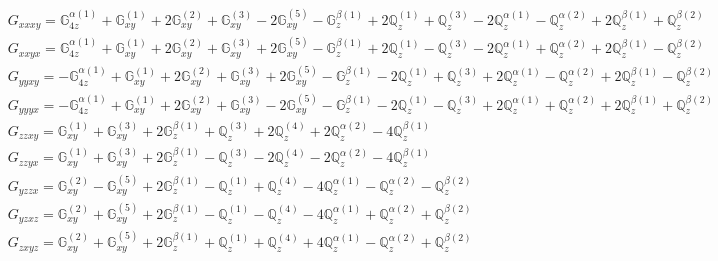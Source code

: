 \documentclass[fleqn,8pt,landscape]{jsarticle}
\begin{document}
\begin{align*}
& G_{xxxy} = \mathbb{G}_{4z}^{\alpha(1)} + \mathbb{G}_{xy}^{(1)} + 2 \mathbb{G}_{xy}^{(2)} + \mathbb{G}_{xy}^{(3)} - 2 \mathbb{G}_{xy}^{(5)} - \mathbb{G}_{z}^{\beta(1)} + 2 \mathbb{Q}_{z}^{(1)} + \mathbb{Q}_{z}^{(3)} - 2 \mathbb{Q}_{z}^{\alpha(1)} - \mathbb{Q}_{z}^{\alpha(2)} + 2 \mathbb{Q}_{z}^{\beta(1)} + \mathbb{Q}_{z}^{\beta(2)} \\
& G_{xxyx} = \mathbb{G}_{4z}^{\alpha(1)} + \mathbb{G}_{xy}^{(1)} + 2 \mathbb{G}_{xy}^{(2)} + \mathbb{G}_{xy}^{(3)} + 2 \mathbb{G}_{xy}^{(5)} - \mathbb{G}_{z}^{\beta(1)} + 2 \mathbb{Q}_{z}^{(1)} - \mathbb{Q}_{z}^{(3)} - 2 \mathbb{Q}_{z}^{\alpha(1)} + \mathbb{Q}_{z}^{\alpha(2)} + 2 \mathbb{Q}_{z}^{\beta(1)} - \mathbb{Q}_{z}^{\beta(2)} \\
& G_{yyxy} = - \mathbb{G}_{4z}^{\alpha(1)} + \mathbb{G}_{xy}^{(1)} + 2 \mathbb{G}_{xy}^{(2)} + \mathbb{G}_{xy}^{(3)} + 2 \mathbb{G}_{xy}^{(5)} - \mathbb{G}_{z}^{\beta(1)} - 2 \mathbb{Q}_{z}^{(1)} + \mathbb{Q}_{z}^{(3)} + 2 \mathbb{Q}_{z}^{\alpha(1)} - \mathbb{Q}_{z}^{\alpha(2)} + 2 \mathbb{Q}_{z}^{\beta(1)} - \mathbb{Q}_{z}^{\beta(2)} \\
& G_{yyyx} = - \mathbb{G}_{4z}^{\alpha(1)} + \mathbb{G}_{xy}^{(1)} + 2 \mathbb{G}_{xy}^{(2)} + \mathbb{G}_{xy}^{(3)} - 2 \mathbb{G}_{xy}^{(5)} - \mathbb{G}_{z}^{\beta(1)} - 2 \mathbb{Q}_{z}^{(1)} - \mathbb{Q}_{z}^{(3)} + 2 \mathbb{Q}_{z}^{\alpha(1)} + \mathbb{Q}_{z}^{\alpha(2)} + 2 \mathbb{Q}_{z}^{\beta(1)} + \mathbb{Q}_{z}^{\beta(2)} \\
& G_{zzxy} = \mathbb{G}_{xy}^{(1)} + \mathbb{G}_{xy}^{(3)} + 2 \mathbb{G}_{z}^{\beta(1)} + \mathbb{Q}_{z}^{(3)} + 2 \mathbb{Q}_{z}^{(4)} + 2 \mathbb{Q}_{z}^{\alpha(2)} - 4 \mathbb{Q}_{z}^{\beta(1)} \\
& G_{zzyx} = \mathbb{G}_{xy}^{(1)} + \mathbb{G}_{xy}^{(3)} + 2 \mathbb{G}_{z}^{\beta(1)} - \mathbb{Q}_{z}^{(3)} - 2 \mathbb{Q}_{z}^{(4)} - 2 \mathbb{Q}_{z}^{\alpha(2)} - 4 \mathbb{Q}_{z}^{\beta(1)} \\
& G_{yzzx} = \mathbb{G}_{xy}^{(2)} - \mathbb{G}_{xy}^{(5)} + 2 \mathbb{G}_{z}^{\beta(1)} - \mathbb{Q}_{z}^{(1)} + \mathbb{Q}_{z}^{(4)} - 4 \mathbb{Q}_{z}^{\alpha(1)} - \mathbb{Q}_{z}^{\alpha(2)} - \mathbb{Q}_{z}^{\beta(2)} \\
& G_{yzxz} = \mathbb{G}_{xy}^{(2)} + \mathbb{G}_{xy}^{(5)} + 2 \mathbb{G}_{z}^{\beta(1)} - \mathbb{Q}_{z}^{(1)} - \mathbb{Q}_{z}^{(4)} - 4 \mathbb{Q}_{z}^{\alpha(1)} + \mathbb{Q}_{z}^{\alpha(2)} + \mathbb{Q}_{z}^{\beta(2)} \\
& G_{zxyz} = \mathbb{G}_{xy}^{(2)} + \mathbb{G}_{xy}^{(5)} + 2 \mathbb{G}_{z}^{\beta(1)} + \mathbb{Q}_{z}^{(1)} + \mathbb{Q}_{z}^{(4)} + 4 \mathbb{Q}_{z}^{\alpha(1)} - \mathbb{Q}_{z}^{\alpha(2)} + \mathbb{Q}_{z}^{\beta(2)} \\

\end{align*}
\end{document}
